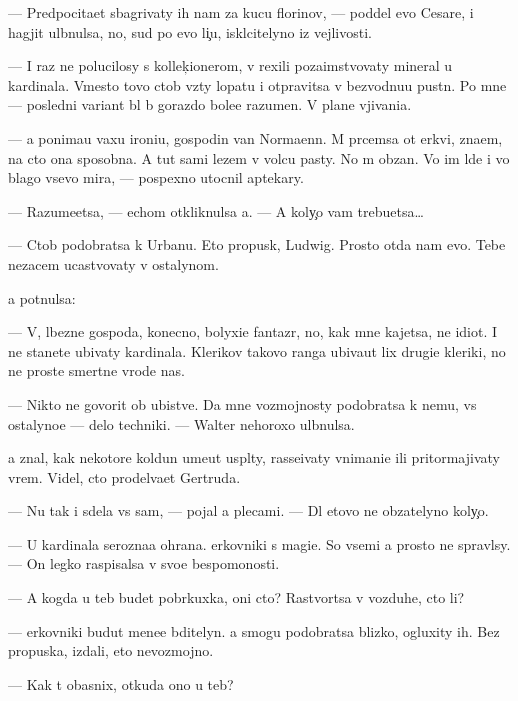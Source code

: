\documentclass[10pt]{book}
\begin{document}
— Predpocita{\y}et sbagrivaty ih nam za kucu florinov, — poddel {\y}evo Cesare, i hagjit ul{\yi}bnulsa, no, sud{\ia} po {\y}evo li{\c}u, iskl{\io}citelyno iz vejlivosti.

— I raz ne polucilosy s kollek{\c}ionerom, v{\yi} rexili poza{\y}imstvovaty mineral u kardinala. Vmesto tovo ctob{\yi} vz{\ia}ty lopatu i otpravitsa v bezvodnu{\y}u pust{\yi}n{\io}. Po mne — posledni{\y} variant b{\yi}l b{\yi} gorazdo bole{\y}e razumen. V plane v{\yi}jivani{\y}a.

— {\Y}a ponima{\y}u vaxu ironi{\y}u, gospodin van Normaenn. M{\yi} pr{\ia}cemsa ot {\C}erkvi, zna{\y}em, na cto ona sposobna. A tut sami lezem v volc{\y}u pasty. No m{\yi} ob{\ia}zan{\yi}. Vo im{\ia} l{\io}de{\y} i vo blago vsevo mira, — pospexno utocnil aptekary.

— Razume{\y}etsa, — echom otkliknulsa {\y}a. — A koly{\c}o vam trebu{\y}etsa…

— Ctob{\yi} podobratsa k Urbanu. Eto propusk, Ludwig. Prosto otda{\y} nam {\y}evo. Tebe nezacem ucastvovaty v ostalynom.

{\Y}a pot{\ia}nulsa:

— V{\yi}, l{\io}bezn{\yi}{\y}e gospoda, konecno, bolyxi{\y}e fantaz{\e}r{\yi}, no, kak mne kajetsa, ne idiot{\yi}. I ne stanete ubivaty kardinala. Klerikov takovo ranga ubiva{\y}ut lix drugi{\y}e kleriki, no ne prost{\yi}{\y}e smertn{\yi}{\y}e vrode nas.

— Nikto ne govorit ob ubi{\y}stve. Da{\y} mne vozmojnosty podobratsa k nemu, vs{\e} ostalyno{\y}e — delo techniki. — Walter nehoroxo ul{\yi}bnulsa.

{\Y}a znal, kak nekotor{\yi}{\y}e koldun{\yi} ume{\y}ut us{\yi}pl{\ia}ty, rasse{\y}ivaty vnimani{\y}e ili pritormajivaty vrem{\ia}. Videl, cto prodel{\yi}va{\y}et Gertruda.

— Nu tak i sdela{\y} vs{\e} sam, — pojal {\y}a plecami. — Dl{\ia} etovo ne ob{\ia}zatelyno koly{\c}o.

— U kardinala ser{\y}ozna{\y}a ohrana. {\C}erkovniki s magi{\y}e{\y}. So vsemi {\y}a prosto ne spravl{\io}sy. — On legko raspisalsa v svo{\y}e{\y} bespomo{\x}nosti.

— A kogda u teb{\ia} budet pobr{\ia}kuxka, oni cto? Rastvor{\ia}tsa v vozduhe, cto li?

— {\C}erkovniki budut mene{\y}e bditelyn{\yi}. {\Y}a smogu podobratsa blizko, ogluxity ih. Bez propuska, izdali, eto nevozmojno.

— Kak t{\yi} ob{\y}asnix, otkuda ono u teb{\ia}?
\end{document}
